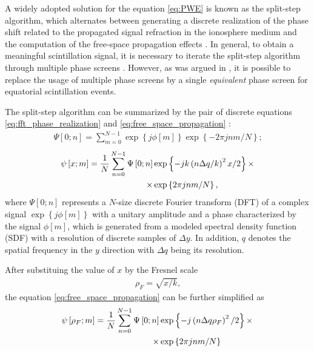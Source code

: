 A widely adopted solution for the equation \eqref{eq:PWE} is known as the split-step algorithm, which alternates between generating a discrete realization of the phase shift related to the propagated signal refraction in the ionosphere medium and the computation of the free-space propagation effects \cite{rinoTheoryScintillationApplications2011}. In general, to obtain a meaningful scintillation signal, it is necessary to iterate the split-step algorithm through multiple phase screens \cite{vasylyevModelingIonosphericScintillation2022}. However, as was argued in \cite{rinoCompactMultifrequencyGNSS2018}, it is possible to replace the usage of multiple phase screens by a single \textit{equivalent} phase screen for equatorial scintillation events. 

The split-step algorithm can be summarized by the pair of discrete equations \eqref{eq:fft_phase_realization} and \eqref{eq:free_space_propagation} \cite[Equations 1 and 2]{xuTwoparameterMultifrequencyGPS2020}:
\begin{align}
    \label{eq:fft_phase_realization}
    \Psi\left[ 0; n \right] = \sum^{N-1}_{m=0}{\exp\left\{ j \phi\left[ m \right] \right\} \exp\left\{ -2\pi j n m / N \right\}} \text{;}
\end{align}
\begin{align}
    \label{eq:free_space_propagation}
    \psi\left[ x; m  \right] = \frac{1}{N}  \sum^{N-1}_{n=0} \Psi\left[ 0; n \right]
    &\exp \left\{ -j k \left( n \Delta q / k \right)^2 x / 2 \right\} \times \notag \\ 
    \times & \exp\left\{ 2 \pi j n m / N \right\} \text{,}
\end{align}
where $\Psi \left[ 0; n \right]$ represents a $N$-size discrete Fourier transform (DFT) of a complex signal $\exp\left\{ j \phi\left[ m \right] \right\}$ with a unitary amplitude and a phase characterized by the signal $\phi\left[ m \right]$, which is generated from a modeled spectral density function (SDF) with a resolution of discrete samples of $\Delta y$. In addition, $q$ denotes the spatial frequency in the $y$ direction with $\Delta q$ being its resolution.

After substituing the value of $x$ by the Fresnel scale
\begin{align}
    \rho_F = \sqrt{x/k} \text{,}
\end{align}
the equation \eqref{eq:free_space_propagation} can be further simplified as
\begin{align}
    \label{eq:free_space_propagation_simplified}
    \psi\left[ \rho_F; m \right] = \frac{1}{N} \sum_{n=0}^{N-1} \Psi\left[ 0; n \right]
    & \exp \left\{ -j\left( n\Delta q \rho_F \right)^2 /2 \right\} \times \notag \\
    \times & \exp \left\{ 2\pi j n m /N \right\}
\end{align}

